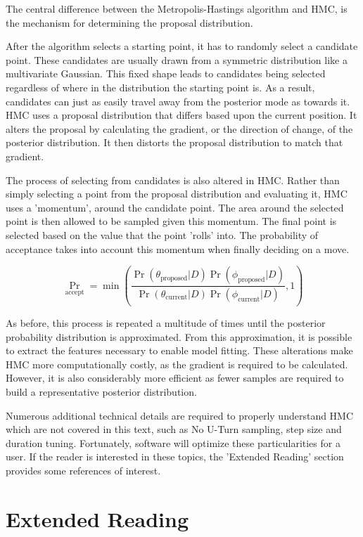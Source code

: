 The central difference between the Metropolis-Hastings algorithm and HMC, is the mechanism for determining the proposal distribution\cite{Kruschke2015}. 

After the algorithm selects a starting point, it has to randomly select a candidate point. These candidates are usually drawn from a symmetric distribution like a multivariate Gaussian. This fixed shape leads to candidates being selected regardless of where in the distribution the starting point is. As a result, candidates can just as easily travel away from the posterior mode as towards it. HMC uses a proposal distribution that differs based upon the current position. It alters the proposal by calculating the gradient, or the direction of change, of the posterior distribution. It then distorts the proposal distribution to match that gradient.

The process of selecting from candidates is also altered in HMC. Rather than simply selecting a point from the proposal distribution and evaluating it, HMC uses a 'momentum', around the candidate point. The area around the selected point is then allowed to be sampled given this momentum. The final point is selected based on the value that the point 'rolls' into\cite{Kruschke2015}. The probability of acceptance takes into account this momentum when finally deciding on a move.

$$ \Pr_{\text{accept}} = \min\left (\frac{\Pr(\theta_{\text{proposed}}|D)\Pr(\phi_{\text{proposed}}|D)}{\Pr(\theta_{\text{current}}|D)\Pr(\phi_{\text{current}}|D)} , 1 \right )$$

As before, this process is repeated a multitude of times until the posterior probability distribution is approximated. From this approximation, it is possible to extract the features necessary to enable model fitting. These alterations make HMC more computationally costly, as the gradient is required to be calculated. However, it is also considerably more efficient as fewer samples are required to build a representative posterior distribution.


Numerous additional technical details are required to properly understand HMC which are not covered in this text, such as No U-Turn sampling, step size and duration tuning. Fortunately, software will optimize these particularities for a user. If the reader is interested in these topics, the 'Extended Reading' section provides some references of interest.



\section*{Extended Reading}

